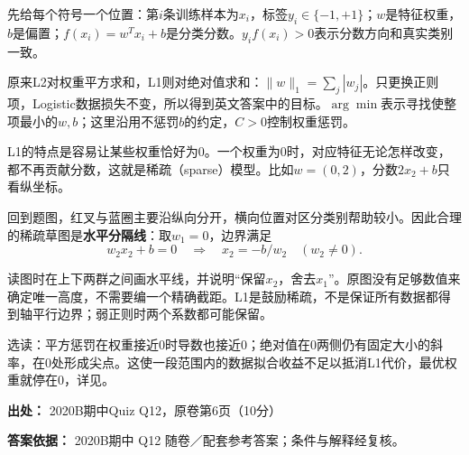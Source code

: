 先给每个符号一个位置：第\(i\)条训练样本为\(x_i\)，标签\(y_i\in\{-1,+1\}\)；\(w\)是特征权重，\(b\)是偏置；\(f(x_i)=w^Tx_i+b\)是分类分数。\(y_if(x_i)>0\)表示分数方向和真实类别一致。


原来L2对权重平方求和，L1则对绝对值求和：\(\|w\|_1=\sum_j|w_j|\)。只更换正则项，Logistic数据损失不变，所以得到英文答案中的目标。\(\arg\min\)表示寻找使整项最小的\(w,b\)；这里沿用不惩罚\(b\)的约定，\(C>0\)控制权重惩罚。


L1的特点是容易让某些权重恰好为0。一个权重为0时，对应特征无论怎样改变，都不再贡献分数，这就是稀疏（sparse）模型。比如\(w=(0,2)\)，分数\(2x_2+b\)只看纵坐标。


回到题图，红叉与蓝圈主要沿纵向分开，横向位置对区分类别帮助较小。因此合理的稀疏草图是\textbf{水平分隔线}：取\(w_1=0\)，边界满足
\[
w_2x_2+b=0\quad\Longrightarrow\quad x_2=-b/w_2\quad(w_2\ne0).
\]


读图时在上下两群之间画水平线，并说明“保留\(x_2\)，舍去\(x_1\)”。原图没有足够数值来确定唯一高度，不需要编一个精确截距。L1是鼓励稀疏，不是保证所有数据都得到轴平行边界；弱正则时两个系数都可能保留。


选读：平方惩罚在权重接近0时导数也接近0；绝对值在0两侧仍有固定大小的斜率，在0处形成尖点。这使一段范围内的数据拟合收益不足以抵消L1代价，最优权重就停在0，详见。


\textbf{出处：} 2020B期中Quiz Q12，原卷第6页（10分）


\textbf{答案依据：} 2020B期中 Q12 随卷／配套参考答案；条件与解释经复核。
